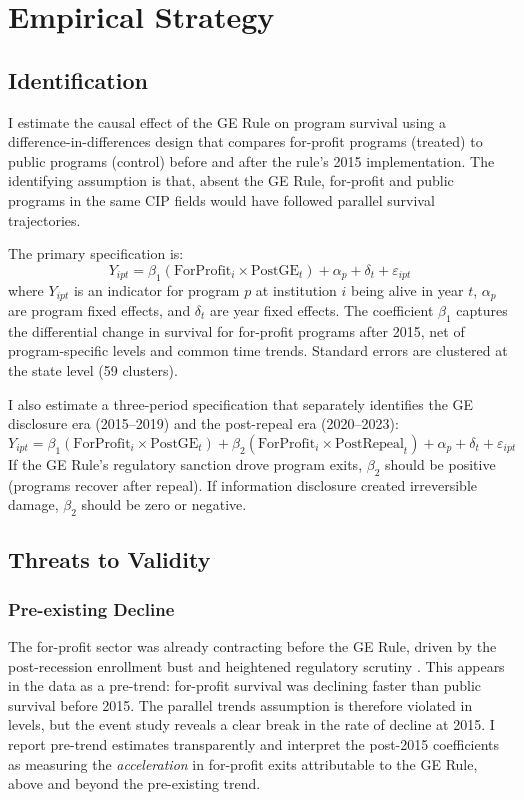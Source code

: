 \documentclass[12pt]{article}
\begin{document}
\section{Empirical Strategy}

\subsection{Identification}

I estimate the causal effect of the GE Rule on program survival using a difference-in-differences design that compares for-profit programs (treated) to public programs (control) before and after the rule's 2015 implementation. The identifying assumption is that, absent the GE Rule, for-profit and public programs in the same CIP fields would have followed parallel survival trajectories.

The primary specification is:
\begin{equation}
Y_{ipt} = \beta_1 (\text{ForProfit}_i \times \text{PostGE}_t) + \alpha_p + \delta_t + \varepsilon_{ipt}
\label{eq:did}
\end{equation}
where $Y_{ipt}$ is an indicator for program $p$ at institution $i$ being alive in year $t$, $\alpha_p$ are program fixed effects, and $\delta_t$ are year fixed effects. The coefficient $\beta_1$ captures the differential change in survival for for-profit programs after 2015, net of program-specific levels and common time trends. Standard errors are clustered at the state level (59 clusters).

I also estimate a three-period specification that separately identifies the GE disclosure era (2015--2019) and the post-repeal era (2020--2023):
\begin{equation}
Y_{ipt} = \beta_1 (\text{ForProfit}_i \times \text{PostGE}_t) + \beta_2 (\text{ForProfit}_i \times \text{PostRepeal}_t) + \alpha_p + \delta_t + \varepsilon_{ipt}
\label{eq:3period}
\end{equation}
If the GE Rule's regulatory sanction drove program exits, $\beta_2$ should be positive (programs recover after repeal). If information disclosure created irreversible damage, $\beta_2$ should be zero or negative.

\subsection{Threats to Validity}

\subsubsection*{Pre-existing Decline} The for-profit sector was already contracting before the GE Rule, driven by the post-recession enrollment bust and heightened regulatory scrutiny \citep{deming_goldin_katz2012}. This appears in the data as a pre-trend: for-profit survival was declining faster than public survival before 2015. The parallel trends assumption is therefore violated in levels, but the event study reveals a clear break in the rate of decline at 2015. I report pre-trend estimates transparently and interpret the post-2015 coefficients as measuring the \textit{acceleration} in for-profit exits attributable to the GE Rule, above and beyond the pre-existing trend.
\end{document}
